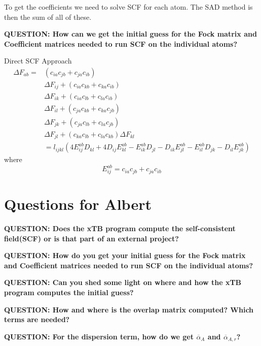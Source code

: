 \documentclass{article}
\newcommand{\q}[1]{\textbf{QUESTION: #1}}
\begin{document}
To get the coefficients we need to solve SCF for each atom.
The SAD method is then the sum of all of these.

\vspace{10pt}
\noindent
\q{How can we get the initial guess for the Fock matrix and Coefficient matrices needed to run SCF on the individual atoms?}

Direct SCF Approach
\begin{equation}
\begin{split}
  \Delta F_{ab} = &(c_{ia}c_{jb} + c_{ja}c_{ib})\\
  &\Delta F_{ij} + (c_{ia}c_{kb} + c_{ka}c_{ib})\\
  &\Delta F_{ik} + (c_{ia}c_{lb} + c_{la}c_{ib})\\
  &\Delta F_{il} + (c_{ja}c_{kb} + c_{ka}c_{jb})\\
  &\Delta F_{jk} + (c_{ja}c_{lb} + c_{la}c_{jb})\\
  &\Delta F_{jl} + (c_{ka}c_{lb} + c_{la}c_{kb}) \Delta F_{kl}\\
  &= l_{ijkl}(4E_{ij}^{ab}D_{kl} + 4D_{ij}E_{kl}^{ab} - E_{ik}^{ab}D_{jl} - D_{ik}E_{jl}^{ab} - E_{il}^{ab}D_{jk} - D_{il}E_{jk}^{ab})
\end{split}
\end{equation}
where
\begin{equation}
  E_{ij}^{ab} = c_{ia}c_{jb} + c_{ja}c_{ib}
\end{equation}



\section{Questions for Albert}

\q{Does the xTB program compute the self-consistent field(SCF) or is that part of an external project?}

\vspace{10pt}
\noindent
\q{How do you get your initial guess for the Fock matrix and Coefficient matrices needed to run SCF on the individual atoms?}

\vspace{10pt}
\noindent
\q{Can you shed some light on where and how the xTB program computes the initial guess?}

\vspace{10pt}
\noindent
\q{How and where is the overlap matrix computed? Which terms are needed?}

\vspace{10pt}
\noindent
\q{For the dispersion term, how do we get \(\overline{\alpha}_A\) and \(\overline{\alpha}_{A,r}\)?}
\end{document}
